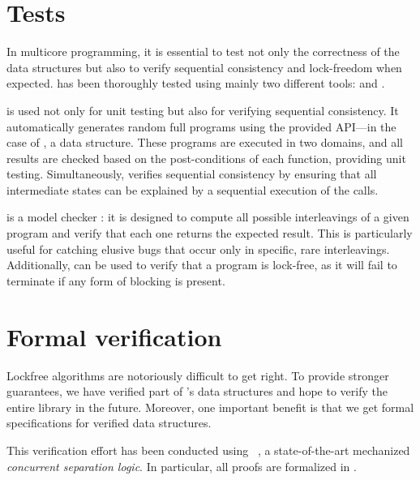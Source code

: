 \documentclass[a4paper, 11pt]{article}
\begin{document}



\section{Tests}
In multicore programming, it is essential to test not only the correctness of the data structures but also to verify sequential consistency and lock-freedom when expected. \Saturn has been thoroughly tested using mainly two different tools: \dscheck and \STM. 

\STM is used not only for unit testing but also for verifying sequential consistency. It automatically generates random full programs using the provided API—in the case of \Saturn, a data structure. These programs are executed in two domains, and all results are checked based on the post-conditions of each function, providing unit testing. Simultaneously, \STM verifies sequential consistency by ensuring that all intermediate states can be explained by a sequential execution of the calls.

\dscheck is a model checker : it is designed to compute all possible interleavings of a given program and verify that each one returns the expected result. This is particularly useful for catching elusive bugs that occur only in specific, rare interleavings. Additionally, \dscheck can be used to verify that a program is lock-free, as it will fail to terminate if any form of blocking is present.

\section{Formal verification}

Lockfree algorithms are notoriously difficult to get right.
To provide stronger guarantees, we have verified part of \Saturn's data structures and hope to verify the entire library in the future.
Moreover, one important benefit is that we get formal specifications for verified data structures.

This verification effort has been conducted using \Iris~\cite{DBLP:journals/jfp/JungKJBBD18}, a state-of-the-art mechanized \emph{concurrent separation logic}.
In particular, all proofs are formalized in \Coq.
\end{document}
